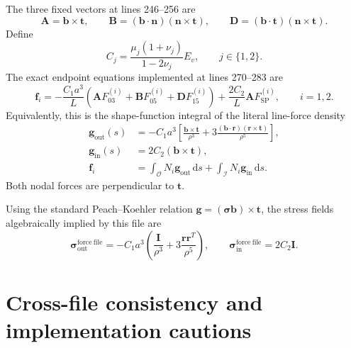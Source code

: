 \documentclass[11pt]{article}
\newcommand{\vect}[1]{\bm{#1}}
\newcommand{\dd}{\,\mathrm{d}}
\begin{document}
The three fixed vectors at lines 246--256 are
\begin{equation}
\vect{A}=\vect{b}\times\vect{t},
\qquad
\vect{B}=(\vect{b}\mathbin{\cdot}\vect{n})(\vect{n}\times\vect{t}),
\qquad
\vect{D}=(\vect{b}\mathbin{\cdot}\vect{t})(\vect{n}\times\vect{t}).
\label{eq:force-vectors}
\end{equation}
Define
\begin{equation}
C_j=\frac{\mu_j(1+\nu_j)}{1-2\nu_j}E_v,
\qquad j\in\{1,2\}.
\label{eq:force-material}
\end{equation}
The exact endpoint equations implemented at lines 270--283 are
\begin{equation}
\boxed{
\vect{f}_i
=-\frac{C_1a^3}{L}
 \left(\vect{A}F_{03}^{(i)}
      +\vect{B}F_{05}^{(i)}
      +\vect{D}F_{15}^{(i)}\right)
 +\frac{2C_2}{L}\vect{A}F_{\mathrm{SP}}^{(i)},
\qquad i=1,2.
}
\label{eq:endpoint-force}
\end{equation}
Equivalently, this is the shape-function integral of the literal line-force
density
\begin{align}
\vect{g}_{\mathrm{out}}(s)
&=-C_1a^3\left[
 \frac{\vect{b}\times\vect{t}}{\rho^3}
 +3\frac{(\vect{b}\mathbin{\cdot}\vect{r})
          (\vect{r}\times\vect{t})}{\rho^5}
 \right],
\label{eq:outside-density}\\
\vect{g}_{\mathrm{in}}(s)
&=2C_2(\vect{b}\times\vect{t}),
\label{eq:inside-density}\\
\vect{f}_i&=\int_{\mathcal O}N_i\vect{g}_{\mathrm{out}}\dd s
            +\int_{\mathcal I}N_i\vect{g}_{\mathrm{in}}\dd s.
\label{eq:nodal-integral}
\end{align}
Both nodal forces are perpendicular to \(\vect{t}\).

Using the standard Peach--Koehler relation
\(\vect{g}=(\vect{\sigma}\vect{b})\times\vect{t}\), the stress fields
algebraically implied by this file are
\begin{equation}
\boxed{
\vect{\sigma}_{\mathrm{out}}^{\mathrm{force\ file}}
=-C_1a^3\left(\frac{\vect{I}}{\rho^3}
              +3\frac{\vect{r}\vect{r}^{T}}{\rho^5}\right),
\qquad
\vect{\sigma}_{\mathrm{in}}^{\mathrm{force\ file}}=2C_2\vect{I}.
}
\label{eq:force-implied-stress}
\end{equation}

\section{Cross-file consistency and implementation cautions}
\end{document}
